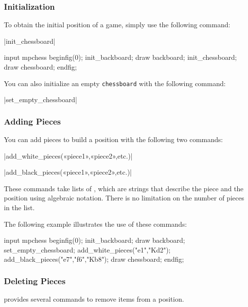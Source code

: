 \documentclass[english]{ltxdoc}
\begin{document}
\subsubsection{Initialization}

To obtain the initial position of a game, simply use the following command:

\commande|init_chessboard|\smallskip

\begin{ExempleMP}
input mpchess
beginfig(0);
init_backboard;
draw backboard;
init_chessboard;
draw chessboard;
endfig;
\end{ExempleMP}

You can also initialize an empty \lstinline+chessboard+ with the following command:

\commande|set_empty_chessboard|\smallskip

\subsubsection{Adding Pieces}

You can add pieces to build a position with the following two commands:

\commande|add_white_pieces(«piece1»,«piece2»,etc.)|\smallskip


\commande|add_black_pieces(«piece1»,«piece2»,etc.)|\smallskip

These commands take lists of \textbf{}, which are strings
that describe the piece and the position using
algebraic notation. There is no limitation on the number of pieces in the list.

The following example illustrates the use of these commands:

\begin{ExempleMP}
input mpchess
beginfig(0);
init_backboard;
draw backboard;
set_empty_chessboard;
add_white_pieces("e1","Kd2");
add_black_pieces("e7","f6","Kb8");
draw chessboard;
endfig;
\end{ExempleMP}


\subsubsection{Deleting Pieces}

\mpchess provides several commands to remove items from a position.
\end{document}
